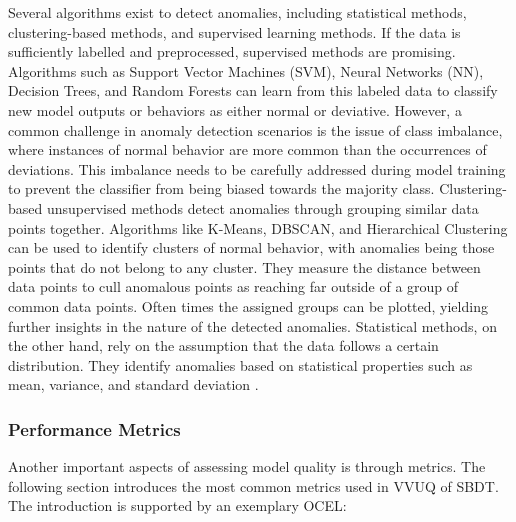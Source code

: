 Several algorithms exist to detect anomalies, including statistical methods, clustering-based methods, and supervised learning methods. If the data is sufficiently labelled and preprocessed, supervised methods are promising. Algorithms such as Support Vector Machines (SVM), Neural Networks (NN), Decision Trees, and Random Forests can learn from this labeled data to classify new model outputs or behaviors as either normal or deviative. However, a common challenge in anomaly detection scenarios is the issue of class imbalance, where instances of normal behavior are more common than the occurrences of deviations. This imbalance needs to be carefully addressed during model training to prevent the classifier from being biased towards the majority class. Clustering-based unsupervised methods detect anomalies through grouping similar data points together. Algorithms like K-Means, DBSCAN, and Hierarchical Clustering can be used to identify clusters of normal behavior, with anomalies being those points that do not belong to any cluster. They measure the distance between data points to cull anomalous points as reaching far outside of a group of common data points. Often times the assigned groups can be plotted, yielding further insights in the nature of the detected anomalies. Statistical methods, on the other hand, rely on the assumption that the data follows a certain distribution. They identify anomalies based on statistical properties such as mean, variance, and standard deviation  \parencite{chandola2009anomaly}.

\subsubsection*{Performance Metrics}
\label{sec:metrics-theory}
Another important aspects of assessing model quality is through metrics. The following section introduces the most common metrics used in VVUQ of SBDT. The introduction is supported by an exemplary OCEL:

